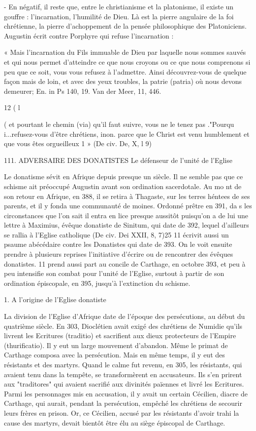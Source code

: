 - En négatif, il reste que, entre le christianisme et la platonisme, il existe un gouffre : l'incarnation, l'humilité de Dieu. Là est la pierre angulaire de la foi chrétienne, la pierre d'achoppement de la pensée philosophique des Platoniciens. Augustin écrit contre Porphyre qui refuse l'incarnation :

« Mais l'incarnation du Fils immuable de Dieu par laquelle nous sommes sauvés et qui nous permet d'atteindre ce que nous croyons ou ce que nous comprenons si peu que ce soit, vous vous refusez à l'admettre. Ainsi découvrez-vous de quelque façon mais de loin, et avec des yeux troubles, la patrie (patria) où nous devons demeurer;
 	En. in Ps 140, 19. Van der Meer, 11, 446.


12
(	l
 
(
et  pourtant  le chemin  (via) qu'il  faut  suivre,  vous  ne  le  tenez pas  ."Pourqu i...refusez-vous d'être chrétiens, inon. parce que le Christ est venu humblement et que vous êtes orgueilleux 1 » (De civ. De, X, l 9)



111.	ADVERSAIRE	DES DONATISTES Le défenseur  de l'unité de l'Eglise


Le donatisme sévit en Afrique depuis presque un siècle. Il ne semble pas que ce schisme ait préoccupé Augustin avant son ordination sacerdotale. Au mo nt de son retour en Afrique, en 388, il se retira à Thagaste, sur les terres héntees de ses parents, et il y fonda une communauté de moines. Ordonné prêtre en 391, da s les circonstances que l'on sait il entra en lice presque aussitôt puisqu'on a de lui une lettre à Maximius, évêque donatiste de Sinitum, qui date de 392, lequel d'ailleurs se rallia à l'Eglise catholique (De civ. Dei XXII, 8, 7)25  11 écrivit aussi un psaume abécédaire contre les Donatistes qui date de 393. On le voit ensuite prendre à plusieurs reprises l'initiative d'écrire ou de rencontrer des évêques donatistes. 11 prend aussi part au concile de Carthage, en octobre 393, et peu à peu intensifie son combat pour l'unité de l'Eglise, surtout à partir de son ordination épiscopale, en 395, jusqu'à l'extinction du schisme.

1.	A  l'origine  de l'Eglise  donatiste

La division de l'Eglise d'Afrique date de l'époque des persécutions, au début du quatrième siècle. En 303, Dioclétien avait exigé des chrétiens de Numidie qu'ils livrent les Ecritures (traditio) et sacrifient aux dieux protecteurs de l'Empire (thurificatio). Il y eut un large mouvement d'abandon. Même le primat de Carthage composa avec la persécution. Mais en même temps, il y eut des résistants et des martyrs. Quand le calme fut revenu, en 305, les résistants, qui avaient tenu dans la tempête, se transformèrent en accusateurs. Ils s'en prirent aux "traditores" qui avaient sacrifié aux divinités païennes et livré les Ecritures. Parmi les personnages mis en accusation, il y avait un certain Cécilien, diacre de Carthage, qui aurait, pendant la persécution, empêché les chrétiens de secourir leurs frères en prison. Or, ce Cécilien, accusé par les résistants d'avoir trahi la cause des martyrs, devait bientôt être élu au siège épiscopal de Carthage.

